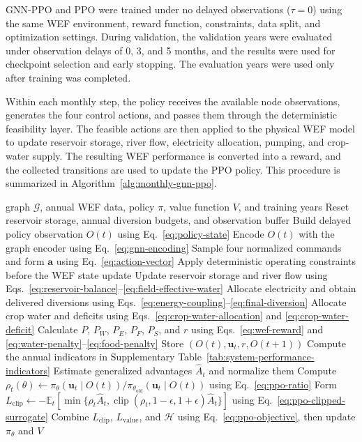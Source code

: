 \documentclass [a4paper,fleqn] {cas-dc}
\begin{document}
GNN-PPO and PPO were trained under no delayed observations ($\tau=0$) using the same WEF environment, reward function, constraints, data split, and optimization settings. During validation, the validation years were evaluated under observation delays of 0, 3, and 5 months, and the results were used for checkpoint selection and early stopping. The evaluation years were used only after training was completed.

Within each monthly step, the policy receives the available node observations, generates the four control actions, and passes them through the deterministic feasibility layer. The feasible actions are then applied to the physical WEF model to update reservoir storage, river flow, electricity allocation, pumping, and crop-water supply. The resulting WEF performance is converted into a reward, and the collected transitions are used to update the PPO policy. This procedure is summarized in Algorithm~\ref{alg:monthly-gnn-ppo}.

\begin{algorithm}[H] \caption{Monthly GNN--PPO training and WEF execution} \label{alg:monthly-gnn-ppo} \scriptsize \begin{algorithmic}[1] \Require graph $\mathcal G$, annual WEF data, policy $\pi$, value function $V$, and training years   \State Reset reservoir storage, annual diversion budgets, and observation buffer  \State Build delayed policy observation $O(t)$ using Eq.~\eqref{eq:policy-state} \State Encode $O(t)$ with the graph encoder using Eq.~\eqref{eq:gnn-encoding} \State Sample four normalized commands and form $\mathbf a$ using Eq.~\eqref{eq:action-vector} \State Apply deterministic operating constraints before the WEF state update \State Update reservoir storage and river flow using Eqs.~\eqref{eq:reservoir-balance}--\eqref{eq:field-effective-water} \State Allocate electricity and obtain delivered diversions using Eqs.~\eqref{eq:energy-coupling}--\eqref{eq:final-diversion} \State Allocate crop water and deficits using Eqs.~\eqref{eq:crop-water-allocation} and \eqref{eq:crop-water-deficit} \State Calculate $P$, $P_W$, $P_E$, $P_F$, $P_S$, and $r$ using Eqs.~\eqref{eq:wef-reward} and \eqref{eq:water-penalty}--\eqref{eq:food-penalty} \State Store $(O(t),\mathbf u_t,r,O(t+1))$ \EndFor \State Compute the annual indicators in Supplementary Table~\ref{tab:system-performance-indicators} \EndFor \State Estimate generalized advantages $\hat A_t$ and normalize them \State Compute $\rho_t(\theta)\gets\pi_\theta(\mathbf u_t\mid O(t))/\pi_{\theta_{\mathrm{old}}}(\mathbf u_t\mid O(t))$ using Eq.~\eqref{eq:ppo-ratio} \State Form $L_{\mathrm{clip}}\gets-\mathbb E_t[\min\{\rho_t\hat A_t,\operatorname{clip}(\rho_t,1-\epsilon,1+\epsilon)\hat A_t\}]$ using Eq.~\eqref{eq:ppo-clipped-surrogate} \State Combine $L_{\mathrm{clip}}$, $L_{\mathrm{value}}$, and $\mathcal H$ using Eq.~\eqref{eq:ppo-objective}, then update $\pi_\theta$ and $V$ \EndFor \end{algorithmic} \end{algorithm}
\end{document}
